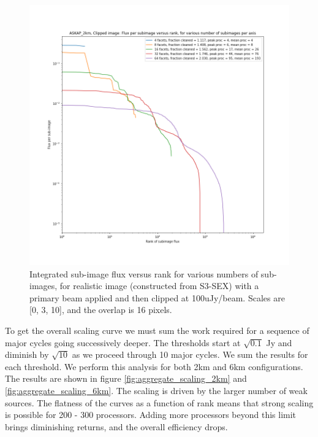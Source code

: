 \documentclass[11pt,a4paper,variablewidth]{article}
\begin{document}
\begin{figure}[h]
  \centering
  \includegraphics[width=\textwidth]{./pngs/fluxes_clipped_image_ASKAP_2km.png}
  \caption{Integrated sub-image flux versus rank for various numbers of sub-images, for realistic image (constructed from S3-SEX) with a primary beam applied and then clipped at 100uJy/beam. Scales are [0, 3, 10], and the overlap is 16 pixels.} 
  \label{fig:fractions_clipped_image}
\end{figure}

To get the overall scaling curve we must sum the work required for a sequence of major cycles going successively deeper. The thresholds start at $\sqrt{0.1}$ Jy and diminish by $\sqrt{10}$ as we proceed through 10 major cycles. We sum the results for each threshold. We perform this analysis for both 2km and 6km configurations. The results are shown in figure \ref{fig:aggregate_scaling_2km} and \ref{fig:aggregate_scaling_6km}. The scaling is driven by the larger number of weak sources. The flatness of the curves as a function of rank means that strong scaling is possible for 200 - 300 processors. Adding more processors beyond this limit brings diminishing returns, and the overall efficiency drops.
\end{document}
